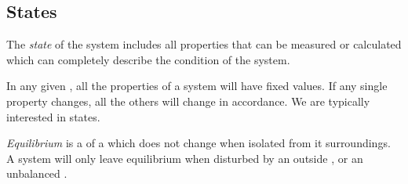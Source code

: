 \subsection{States}\label{subsec:States}
\begin{definition}[State]\label{def:State}
  The \emph{state} of the system includes all properties that can be measured or calculated which can completely describe the condition of the system.
\end{definition}

In any given , all the properties of a system will have fixed values.
If any single property changes, all the others will change in accordance.
We are typically interested in  states.

\begin{definition}[Equilibrium]\label{def:Equilibrium}
  \emph{Equilibrium} is a  of a  which does not change when isolated from it surroundings.
  A system will only leave equilibrium when disturbed by an outside , or an unbalanced .
\end{definition}


